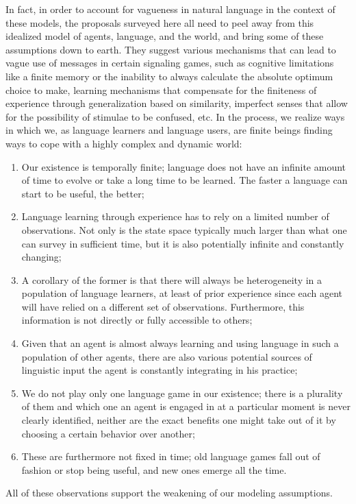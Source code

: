 \documentclass[a4paper]{article}
\begin{document}
In fact, in order to account for vagueness in natural language in the context of these models, the proposals surveyed here all need to peel away from this idealized model of agents, language, and the world, and bring some of these assumptions down to earth.
They suggest various mechanisms that can lead to vague use of messages in certain signaling games, such as cognitive limitations like a finite memory or the inability to always calculate the absolute optimum choice to make, learning mechanisms that compensate for the finiteness of experience through generalization based on similarity, imperfect senses that allow for the possibility of stimulae to be confused, etc.
In the process, we realize ways in which we, as language learners and language users, are finite beings finding ways to cope with a highly complex and dynamic world:
\begin{enumerate}
\item Our existence is temporally finite; language does not have an infinite amount of time to evolve or take a long time to be learned. The faster a language can start to be useful, the better;
\item Language learning through experience has to rely on a limited number of observations. Not only is the state space typically much larger than what one can survey in sufficient time, but it is also potentially infinite and constantly changing;
\item A corollary of the former is that there will always be heterogeneity in a population of language learners, at least of prior experience since each agent will have relied on a different set of observations. Furthermore, this information is not directly or fully accessible to others;
\item Given that an agent is almost always learning and using language in such a population of other agents, there are also various potential sources of linguistic input the agent is constantly integrating in his practice;
\item We do not play only one language game in our existence; there is a plurality of them and which one an agent is engaged in at a particular moment is never clearly identified, neither are the exact benefits one might take out of it by choosing a certain behavior over another;
\item These are furthermore not fixed in time; old language games fall out of fashion or stop being useful, and new ones emerge all the time.
\end{enumerate}
All of these observations support the weakening of our modeling assumptions.
\end{document}
